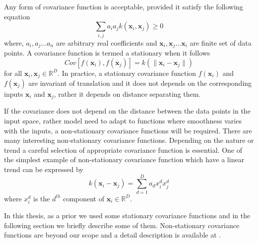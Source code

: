 Any form of covariance function is acceptable, provided it satisfy the following equation
\begin{equation} \label{eq:cov_basic}
\sum_{i,j} a_i a_j k\left(\textbf{x}_i,\textbf{x}_j\right)\geq 0
\end{equation}
where, $a_i, a_j \dots a_n$ are arbitrary real coefficients and $\textbf{x}_i, \textbf{x}_j \dots \textbf{x}_i$ are finite set of data points. A covariance function is termed a stationary when it follows
\begin{equation} \label{eq:cov_stationary}
Cov\left[f\left(\textbf{x}_i\right),f\left(\textbf{x}_j\right)\right] = k\left( \lVert \textbf{x}_i -\textbf{x}_j \rVert \right)
\end{equation}
for all $\textbf{x}_i,\textbf{x}_j \in \mathbb{R}^D$. In practice, a stationary covariance function $f\left(\textbf{x}_i\right)$ and $f\left(\textbf{x}_j\right)$ are invariant of translation and it does not depends on the corresponding inputs $\textbf{x}_i$ and $\textbf{x}_j$, rather it depends on distance separating them. 

If the covariance does not depend on the distance between the data points in the input space, rather model need to adapt to functions where smoothness varies with the inputs, a non-stationary covariance functions will be required. There are many interesting non-stationary covariance functions. Depending on the nature or trend a careful selection of appropriate covariance function is essential. One of the simplest example of non-stationary covariance function which have a linear trend can be expressed by 
\begin{equation} \label{eq:cov_nonStationary}
k\left( \textbf{x}_i -\textbf{x}_j \right) = \sum_{d=1}^{D} a_d x_i^d x_j^d
\end{equation}
where $x_i^d$ is the $d^{th}$ component of $\textbf{x}_i \in \mathbb{R}^D$. 

In this thesis, as a prior we used some stationary covariance functions and in the following section we briefly describe some of them. Non-stationary covariance functions are beyond our scope and a detail description is available at \cite{Rasmussen_and_Williams:2006}.

